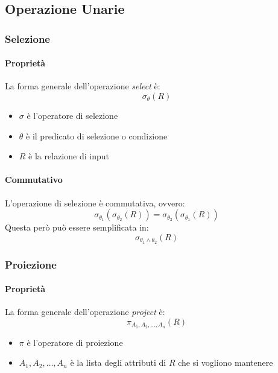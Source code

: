     \subsection{Operazione Unarie}
        \subsubsection{Selezione}
            \paragraph{Proprietà}
                La forma generale dell'operazione \textit{select} è:
                $$
                    \sigma_{\theta} (R)
                $$
                \begin{itemize}
                    \item $\sigma$ è l'operatore di selezione
                    \item $\theta$ è il predicato di selezione o condizione
                    \item $R$ è la relazione di input
                \end{itemize}
            \paragraph{Commutativo} L'operazione di selezione è commutativa, ovvero:
                $$
                    \sigma_{\theta_1} ( \sigma_{\theta_2} (R) ) = \sigma_{\theta_2} ( \sigma_{\theta_1} (R) )
                $$
                Questa però può essere semplificata in:
                $$
                    \sigma_{\theta_1 \land \theta_2} (R)
                $$
            
        \subsubsection{Proiezione}
            \paragraph{Proprietà} La forma generale dell'operazione \textit{project} è:
                $$
                    \pi_{A_1, A_2, \dots, A_n} (R)
                $$
                \begin{itemize}
                    \item $\pi$ è l'operatore di proiezione
                    \item $A_1, A_2, \dots, A_n$ è la lista degli attributi di $R$ che si vogliono mantenere
                \end{itemize}

